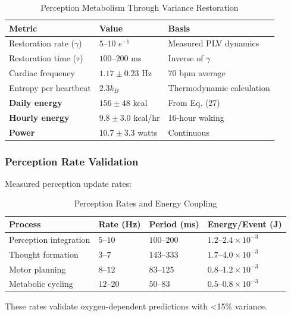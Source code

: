 \documentclass[12pt,twocolumn]{article}
\theoremstyle{remark}
\begin{document}
\begin{table}[H]
\centering
\caption{Perception Metabolism Through Variance Restoration}
\begin{tabular}{@{}lll@{}}
\toprule
\textbf{Metric} & \textbf{Value} & \textbf{Basis} \\
\midrule
Restoration rate ($\gamma$) & $5$--$10$ s$^{-1}$ & Measured PLV dynamics \\
Restoration time ($\tau$) & $100$--$200$ ms & Inverse of $\gamma$ \\
Cardiac frequency & $1.17 \pm 0.23$ Hz & 70 bpm average \\
Entropy per heartbeat & $2.3 k_B$ & Thermodynamic calculation \\
\midrule
\textbf{Daily energy} & $156 \pm 48$ kcal & From Eq. (27) \\
\textbf{Hourly energy} & $9.8 \pm 3.0$ kcal/hr & 16-hour waking \\
\textbf{Power} & $10.7 \pm 3.3$ watts & Continuous \\
\bottomrule
\end{tabular}
\end{table}

\subsubsection{Perception Rate Validation}

Measured perception update rates:

\begin{table}[H]
\centering
\caption{Perception Rates and Energy Coupling}
\begin{tabular}{@{}llll@{}}
\toprule
\textbf{Process} & \textbf{Rate (Hz)} & \textbf{Period (ms)} & \textbf{Energy/Event (J)} \\
\midrule
Perception integration & $5$--$10$ & $100$--$200$ & $1.2$--$2.4 \times 10^{-3}$ \\
Thought formation & $3$--$7$ & $143$--$333$ & $1.7$--$4.0 \times 10^{-3}$ \\
Motor planning & $8$--$12$ & $83$--$125$ & $0.8$--$1.2 \times 10^{-3}$ \\
Metabolic cycling & $12$--$20$ & $50$--$83$ & $0.5$--$0.8 \times 10^{-3}$ \\
\bottomrule
\end{tabular}
\end{table}

These rates validate oxygen-dependent predictions with <15\% variance.
\end{document}
